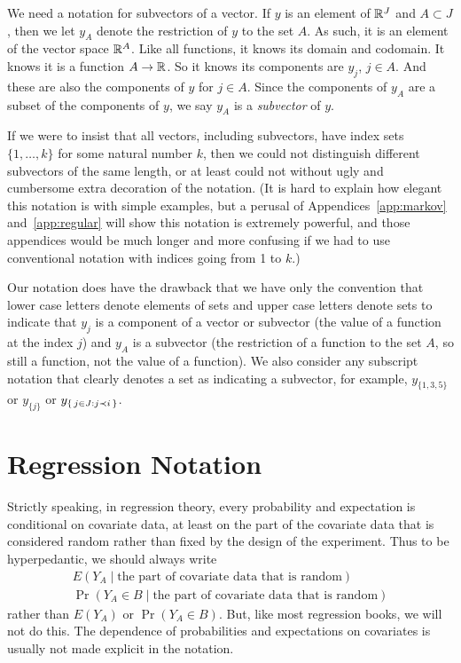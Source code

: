 We need a notation for subvectors of a vector.  If $y$ is an element
of $\mathbb{R}^J$ and $A \subset J$, then we let $y_A$ denote the restriction
of $y$ to the set $A$.
As such, it is an element of the vector space $\mathbb{R}^A$.
Like all functions, it knows its domain and codomain.
It knows it is a function $A \to \mathbb{R}$.
So it knows its components are $y_j$, $j \in A$.
And these are also the components of $y$ for $j \in A$.
Since the components of $y_A$ are a subset of the components of $y$,
we say $y_A$ is a \emph{subvector} of $y$.

If we were to insist that all vectors, including subvectors, have
index sets $\{1, \ldots, k\}$ for some natural number $k$, then we could
not distinguish different subvectors of the same length, or at least could
not without ugly and cumbersome extra decoration of the notation.
(It is hard to explain how elegant this notation is with simple examples,
but a perusal of Appendices~\ref{app:markov} and~\ref{app:regular}
will show this notation is
extremely powerful, and those appendices would be much longer and more confusing
if we had to use conventional notation with indices going from 1 to $k$.)

Our notation does have the drawback that we have only the convention
that lower case letters denote elements of sets and upper case letters
denote sets to indicate that $y_j$ is a component of a vector or subvector
(the value of a function at the index $j$) and $y_A$ is a subvector
(the restriction of a function to the set $A$, so still a function,
not the value of a function).
We also consider any subscript notation that clearly denotes a set
as indicating a subvector, for example, $y_{\{1, 3, 5\}}$ or $y_{\{j\}}$ or
$y_{\{\,  j \in J : j \prec i  \,\}}$.

\section{Regression Notation}

Strictly speaking, in regression theory, every probability and expectation
is conditional on covariate data, at least on the part of the covariate data
that is considered random rather than fixed by the design of the experiment.
Thus to be hyperpedantic, we should always write
\begin{gather*}
   E(Y_A \mid \text{the part of covariate data that is random})
   \\
   \Pr(Y_A \in B \mid \text{the part of covariate data that is random})
\end{gather*}
rather than $E(Y_A)$ or $\Pr(Y_A \in B)$.  But, like most regression books,
we will not do this.  The dependence of probabilities and expectations on
covariates is usually not made explicit in the notation.

